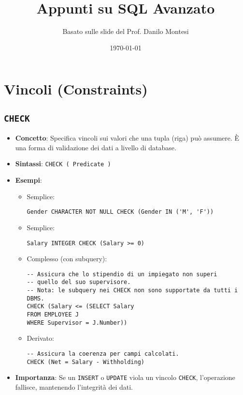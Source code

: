 \documentclass{article}
\title{Appunti su SQL Avanzato}
\author{Basato sulle slide del Prof. Danilo Montesi}
\date{\today}
\begin{document}
	
	\maketitle
	\tableofcontents
	\newpage
	
	\section{Vincoli (Constraints)}
	
	\subsection{\texttt{CHECK}}
	\begin{itemize}
		\item \textbf{Concetto}: Specifica vincoli sui valori che una tupla (riga) può assumere. È una forma di validazione dei dati a livello di database.
		\item \textbf{Sintassi}: \texttt{CHECK ( Predicate )}
		\item \textbf{Esempi}:
		\begin{itemize}
			\item Semplice:
			\begin{verbatim}
Gender CHARACTER NOT NULL CHECK (Gender IN ('M', 'F'))
			\end{verbatim}
			\item Semplice:
			\begin{verbatim}
Salary INTEGER CHECK (Salary >= 0)
			\end{verbatim}
			\item Complesso (con subquery):
			\begin{verbatim}
-- Assicura che lo stipendio di un impiegato non superi
-- quello del suo supervisore.
-- Nota: le subquery nei CHECK non sono supportate da tutti i DBMS.
CHECK (Salary <= (SELECT Salary
FROM EMPLOYEE J
WHERE Supervisor = J.Number))
			\end{verbatim}
			\item Derivato:
			\begin{verbatim}
-- Assicura la coerenza per campi calcolati.
CHECK (Net = Salary - Withholding)
			\end{verbatim}
		\end{itemize}
		\item \textbf{Importanza}: Se un \texttt{INSERT} o \texttt{UPDATE} viola un vincolo \texttt{CHECK}, l'operazione fallisce, mantenendo l'integrità dei dati.
	\end{itemize}
	
\end{document}

